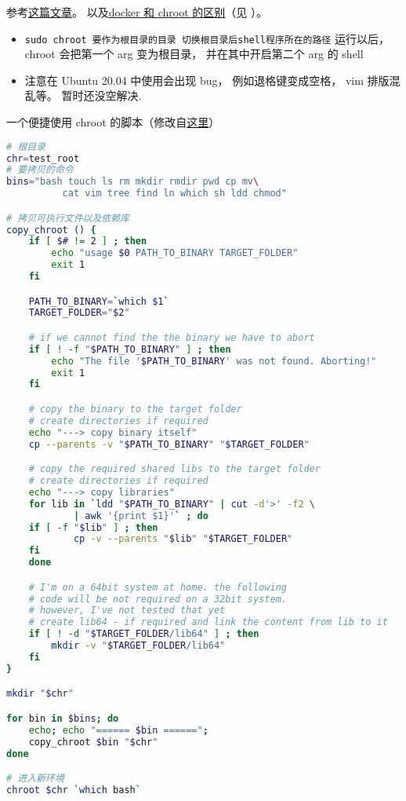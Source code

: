 
\begin{issues}
\issueDraft
\end{issues}

参考\href{https://www.howtogeek.com/441534/how-to-use-the-chroot-command-on-linux/}{这篇文章}。
以及\href{https://devops.stackexchange.com/questions/2826/difference-between-chroot-and-docker}{docker 和 chroot 的区别}（见 ）。

\begin{itemize}
\item \verb|sudo chroot 要作为根目录的目录 切换根目录后shell程序所在的路径| 运行以后， chroot 会把第一个 arg 变为根目录， 并在其中开启第二个 arg 的 shell
\item 注意在 Ubuntu 20.04 中使用会出现 bug， 例如退格键变成空格， vim 排版混乱等。 暂时还没空解决.
\end{itemize}

一个便捷使用 chroot 的脚本（修改自\href{https://gist.github.com/xmonader/5d1fc6134f1f65acd0d10f71453adb27}{这里}）

\begin{lstlisting}[language=bash]
# 根目录
chr=test_root
# 要拷贝的命令
bins="bash touch ls rm mkdir rmdir pwd cp mv\
          cat vim tree find ln which sh ldd chmod"

# 拷贝可执行文件以及依赖库
copy_chroot () {
	if [ $# != 2 ] ; then
		echo "usage $0 PATH_TO_BINARY TARGET_FOLDER"
		exit 1
	fi

	PATH_TO_BINARY=`which $1`
	TARGET_FOLDER="$2"

	# if we cannot find the the binary we have to abort
	if [ ! -f "$PATH_TO_BINARY" ] ; then
		echo "The file '$PATH_TO_BINARY' was not found. Aborting!"
		exit 1
	fi

	# copy the binary to the target folder
	# create directories if required
	echo "---> copy binary itself"
	cp --parents -v "$PATH_TO_BINARY" "$TARGET_FOLDER"

	# copy the required shared libs to the target folder
	# create directories if required
	echo "---> copy libraries"
	for lib in `ldd "$PATH_TO_BINARY" | cut -d'>' -f2 \
            | awk '{print $1}'` ; do
	if [ -f "$lib" ] ; then
			cp -v --parents "$lib" "$TARGET_FOLDER"
	fi  
	done

	# I'm on a 64bit system at home. the following
    # code will be not required on a 32bit system.
	# however, I've not tested that yet
	# create lib64 - if required and link the content from lib to it
	if [ ! -d "$TARGET_FOLDER/lib64" ] ; then
		mkdir -v "$TARGET_FOLDER/lib64"
	fi
}

mkdir "$chr"

for bin in $bins; do
	echo; echo "====== $bin ======";
	copy_chroot $bin "$chr"
done

# 进入新环境
chroot $chr `which bash`
\end{lstlisting}
